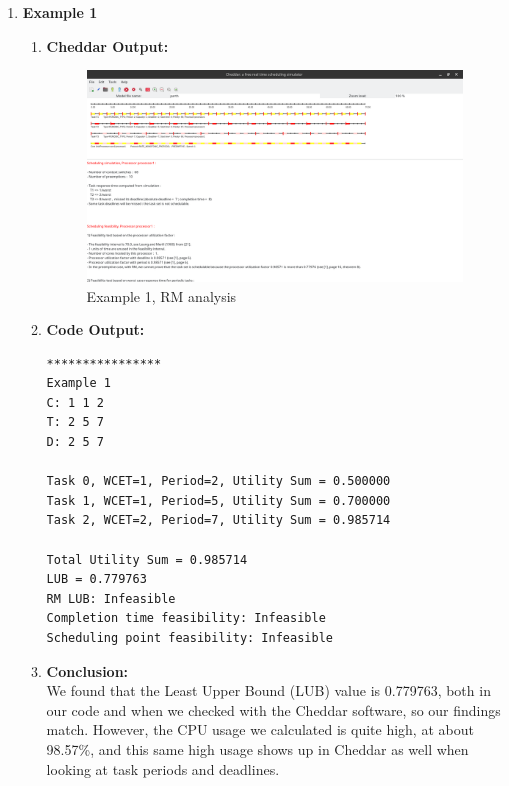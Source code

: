 \documentclass[a4paper,11pt]{article}%
\newenvironment{qanda}{\setlength{\parindent}{0pt}}{\bigskip}
\begin{document}
\begin{qanda}
\begin{enumerate}
\begin{enumerate}
\begin{enumerate}
\begin{enumerate}
					            \end{enumerate}
					      \item \textbf{Example 1}
					            \begin{enumerate}
						            \item \textbf{Cheddar Output:}\\
						                  \begin{figure}[H]
							                  \centering
							                  \includegraphics[scale=0.36]{figures/example1_rm.png}
							                  \caption{Example 1, RM analysis}
						                  \end{figure}
						            \item \textbf{Code Output:}\\
						                  \begin{verbatim}
****************
Example 1
C: 1 1 2
T: 2 5 7
D: 2 5 7

Task 0, WCET=1, Period=2, Utility Sum = 0.500000
Task 1, WCET=1, Period=5, Utility Sum = 0.700000
Task 2, WCET=2, Period=7, Utility Sum = 0.985714

Total Utility Sum = 0.985714
LUB = 0.779763
RM LUB: Infeasible
Completion time feasibility: Infeasible
Scheduling point feasibility: Infeasible
										\end{verbatim}
						            \item \textbf{Conclusion:}\\
						                  We found that the Least Upper Bound (LUB) value is 0.779763, both in our code and when we checked with the Cheddar software, so our findings match. However, the CPU usage we calculated is quite high, at about 98.57\%, and this same high usage shows up in Cheddar as well when looking at task periods and deadlines.\\


\end{enumerate}
\end{enumerate}
\end{enumerate}
\end{enumerate}
\end{qanda}
\end{document}
